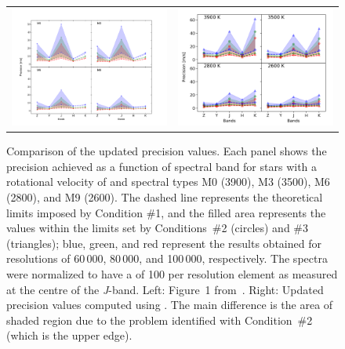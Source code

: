 \begin{figure}
    \centering
    \begin{tabular}{cc}
        \includegraphics[width=0.48\linewidth]{figures/information-content/Rvprec_vsini1.pdf} &  %
        \includegraphics[width=0.47\linewidth]{figures/information-content/precision_fourpanel.png}\\ %
    \end{tabular}
    \caption[Comparision of {RV} precision results to~\citet{figueira_radial_2016}.]{Comparison of the updated precision values.
        Each panel shows the precision achieved as a function of spectral band for stars with a rotational velocity of \kmps{} and spectral types M0 (3900\K), M3 (3500\K), M6 (2800\K), and M9 (2600\K).
        The dashed line represents the theoretical limits imposed by Condition \#1, and the filled area represents the values within the limits set by Conditions~\#2 (circles) and \#3 (triangles); blue, green, and red represent the results obtained for resolutions of 60\,000, 80\,000, and 100\,000, respectively.
        The spectra were normalized to have a \snr{} of 100 per resolution element as measured at the centre of the \emph{J}-band.
        Left: Figure~1 from~\citet{figueira_radial_2016}.
        Right: Updated precision values computed using \eniric{}.
        The main difference is the area of shaded region due to the problem identified with Condition~\#2 (which is the upper edge).}
    \label{fig:figueria_comparision}
\end{figure}



